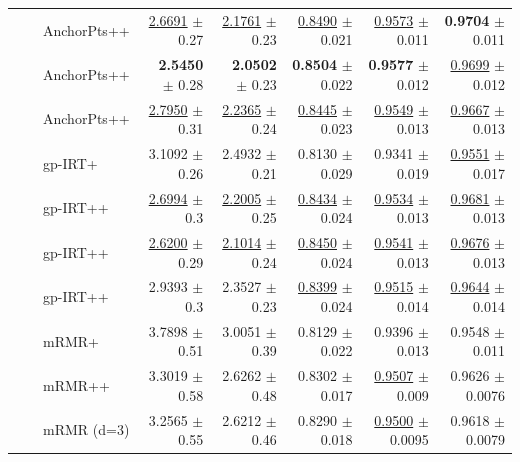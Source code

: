 \begin{longtable}{llp{}rrrrr}
 &  & AnchorPts++ & \underline{2.6691} {\scriptsize $\pm$ 0.27} & \underline{2.1761} {\scriptsize $\pm$ 0.23} & \underline{0.8490} {\scriptsize $\pm$ 0.021} & \underline{0.9573} {\scriptsize $\pm$ 0.011} & \textbf{0.9704} {\scriptsize $\pm$ 0.011} \\
 &  & AnchorPts++ & \textbf{2.5450} {\scriptsize $\pm$ 0.28} & \textbf{2.0502} {\scriptsize $\pm$ 0.23} & \textbf{0.8504} {\scriptsize $\pm$ 0.022} & \textbf{0.9577} {\scriptsize $\pm$ 0.012} & \underline{0.9699} {\scriptsize $\pm$ 0.012} \\
 &  & AnchorPts++ & \underline{2.7950} {\scriptsize $\pm$ 0.31} & \underline{2.2365} {\scriptsize $\pm$ 0.24} & \underline{0.8445} {\scriptsize $\pm$ 0.023} & \underline{0.9549} {\scriptsize $\pm$ 0.013} & \underline{0.9667} {\scriptsize $\pm$ 0.013} \\
 &  & gp-IRT+ & 3.1092 {\scriptsize $\pm$ 0.26} & 2.4932 {\scriptsize $\pm$ 0.21} & 0.8130 {\scriptsize $\pm$ 0.029} & 0.9341 {\scriptsize $\pm$ 0.019} & \underline{0.9551} {\scriptsize $\pm$ 0.017} \\
 &  & gp-IRT++ & \underline{2.6994} {\scriptsize $\pm$ 0.3} & \underline{2.2005} {\scriptsize $\pm$ 0.25} & \underline{0.8434} {\scriptsize $\pm$ 0.024} & \underline{0.9534} {\scriptsize $\pm$ 0.013} & \underline{0.9681} {\scriptsize $\pm$ 0.013} \\
 &  & gp-IRT++ & \underline{2.6200} {\scriptsize $\pm$ 0.29} & \underline{2.1014} {\scriptsize $\pm$ 0.24} & \underline{0.8450} {\scriptsize $\pm$ 0.024} & \underline{0.9541} {\scriptsize $\pm$ 0.013} & \underline{0.9676} {\scriptsize $\pm$ 0.013} \\
 &  & gp-IRT++ & 2.9393 {\scriptsize $\pm$ 0.3} & 2.3527 {\scriptsize $\pm$ 0.23} & \underline{0.8399} {\scriptsize $\pm$ 0.024} & \underline{0.9515} {\scriptsize $\pm$ 0.014} & \underline{0.9644} {\scriptsize $\pm$ 0.014} \\
 &  & mRMR+ & 3.7898 {\scriptsize $\pm$ 0.51} & 3.0051 {\scriptsize $\pm$ 0.39} & 0.8129 {\scriptsize $\pm$ 0.022} & 0.9396 {\scriptsize $\pm$ 0.013} & 0.9548 {\scriptsize $\pm$ 0.011} \\
 &  & mRMR++ & 3.3019 {\scriptsize $\pm$ 0.58} & 2.6262 {\scriptsize $\pm$ 0.48} & 0.8302 {\scriptsize $\pm$ 0.017} & \underline{0.9507} {\scriptsize $\pm$ 0.009} & 0.9626 {\scriptsize $\pm$ 0.0076} \\
 &  & mRMR (d=3) & 3.2565 {\scriptsize $\pm$ 0.55} & 2.6212 {\scriptsize $\pm$ 0.46} & 0.8290 {\scriptsize $\pm$ 0.018} & \underline{0.9500} {\scriptsize $\pm$ 0.0095} & 0.9618 {\scriptsize $\pm$ 0.0079} \\

\end{longtable}
